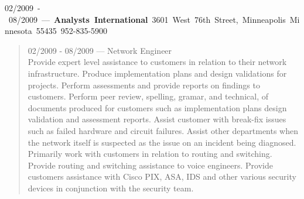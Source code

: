 \mbox{02/2009 - 08/2009 --- {\bf Analysts International} 3601 West 76th Street, Minneapolis Minnesota 55435 952-835-5900}
\begin{quote}
02/2009 - 08/2009 --- Network Engineer\\
Provide expert level assistance to customers in relation to their network infrastructure.  Produce implementation plans and design validations for projects.  Perform assessments and provide reports on findings to customers.  Perform peer review, spelling, gramar, and technical, of documents produced for customers such as implementation plans design validation and assessment reports.  Assist customer with break-fix issues such as failed hardware and circuit failures.  Assist other departments when the network itself is suspected as the issue on an incident being diagnosed.  Primarily work with customers in relation to routing and switching.  Provide routing and switching assistance to voice engineers.  Provide customers assistance with Cisco PIX, ASA, IDS and other various security devices in conjunction with the security team.
\end{quote}

